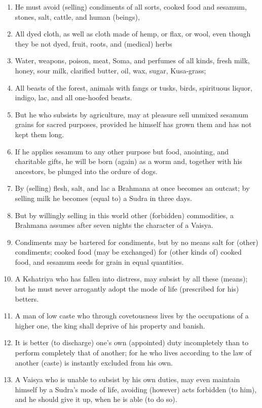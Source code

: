 \begin{enumerate}
\item He must avoid (selling) condiments of all sorts, cooked food and sesamum, stones, salt, cattle, and human (beings),
\item All dyed cloth, as well as cloth made of hemp, or flax, or wool, even though they be not dyed, fruit, roots, and (medical) herbs
\item Water, weapons, poison, meat, Soma, and perfumes of all kinds, fresh milk, honey, sour milk, clarified butter, oil, wax, sugar, Kusa-grass;
\item All beasts of the forest, animals with fangs or tusks, birds, spirituous liquor, indigo, lac, and all one-hoofed beasts.
\item But he who subsists by agriculture, may at pleasure sell unmixed sesamum grains for sacred purposes, provided he himself has grown them and has not kept them long.
\item If he applies sesamum to any other purpose but food, anointing, and charitable gifts, he will be born (again) as a worm and, together with his ancestors, be plunged into the ordure of dogs.
\item By (selling) flesh, salt, and lac a Brahmana at once becomes an outcast; by selling milk he becomes (equal to) a Sudra in three days.
\item But by willingly selling in this world other (forbidden) commodities, a Brahmana assumes after seven nights the character of a Vaisya.
\item Condiments may be bartered for condiments, but by no means salt for (other) condiments; cooked food (may be exchanged) for (other kinds of) cooked food, and sesamum seeds for grain in equal quantities.
\item A Kshatriya who has fallen into distress, may subsist by all these (means); but he must never arrogantly adopt the mode of life (prescribed for his) betters.
\item A man of low caste who through covetousness lives by the occupations of a higher one, the king shall deprive of his property and banish.
\item It is better (to discharge) one's own (appointed) duty incompletely than to perform completely that of another; for he who lives according to the law of another (caste) is instantly excluded from his own.
\item A Vaisya who is unable to subsist by his own duties, may even maintain himself by a Sudra's mode of life, avoiding (however) acts forbidden (to him), and he should give it up, when he is able (to do so).

\end{enumerate}

